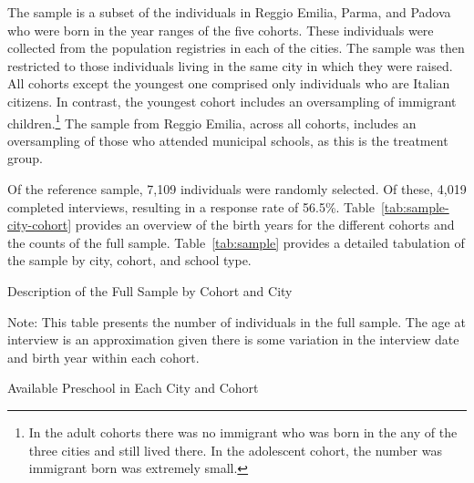 The sample is a subset of the individuals in Reggio Emilia, Parma, and Padova who were born in the year ranges of the five cohorts.  These individuals were collected from the population registries in each of the cities. The sample was then restricted to those individuals living in the same city in which they were raised. All cohorts except the youngest one comprised only individuals who are Italian citizens. In contrast, the youngest cohort includes an oversampling of immigrant children.\footnote{In the adult cohorts there was no immigrant who was born in the any of the three cities and still lived there. In the adolescent cohort, the number was immigrant born was extremely small.} The sample from Reggio Emilia, across all cohorts, includes an oversampling of those who attended municipal schools, as this is the treatment group.

Of the reference sample, 7,109 individuals were randomly selected. Of these, 4,019 completed interviews, resulting in a response rate of 56.5\%. Table~\ref{tab:sample-city-cohort} provides an overview of the birth years for the different cohorts and the counts of the full sample. Table~\ref{tab:sample} provides a detailed tabulation of the sample by city, cohort, and school type.

\begin{table}[H]
\centering
\begin{threeparttable}
	\caption{Description of the Full Sample by Cohort and City}\label{tab:sample-city-cohort}
	
\begin{tablenotes}
\footnotesize
Note: This table presents the number of individuals in the full sample. The age at interview is an approximation given there is some variation in the interview date and birth year within each cohort.
\end{tablenotes}
\end{threeparttable}
\end{table}



\begin{table}[H]
\centering

	\caption{Available Preschool in Each City and Cohort}\label{tab:sample-city-cohort}
	
\end{table}


